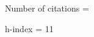 \documentclass[11pt,notitlepage,english]{report}
\begin{document}
\hspace{1cm} Number of citations = \totalcitations%

\hspace{1cm} h-index = 11


\newcommand{\ifajnr}{3.65}
\newcommand{\ifcmajo}{6.94}
\newcommand{\ifcercor}{4.86}
\newcommand{\iffrontneur}{4.00}
\newcommand{\iffronthum}{2.33}
\newcommand{\iffrontphys}{4.56}
\newcommand{\ifhbm}{4.55}
\newcommand{\ifjmri}{4.81}
\newcommand{\ifmagma}{2.84}
\newcommand{\ifnatneur}{21.13}
\newcommand{\ifneurimag}{7.4}
\newcommand{\ifnmr}{4.04}
\newcommand{\ifnutrients}{5.72}
\newcommand{\ifpedres}{3.1}
\newcommand{\ifprog}{5.07}
\newcommand{\ifpsych}{11.22}
\newcommand{\iftopics}{2.9}
\newcommand{\ifvisual}{1.3}
\end{document}
